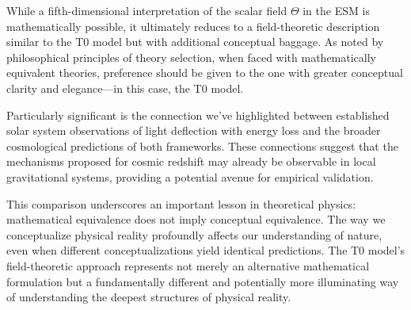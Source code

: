 \documentclass[12pt,a4paper]{article}
\begin{document}
	While a fifth-dimensional interpretation of the scalar field \(\Theta\) in the ESM is mathematically possible, it ultimately reduces to a field-theoretic description similar to the T0 model but with additional conceptual baggage. As noted by philosophical principles of theory selection, when faced with mathematically equivalent theories, preference should be given to the one with greater conceptual clarity and elegance—in this case, the T0 model.
	
	Particularly significant is the connection we've highlighted between established solar system observations of light deflection with energy loss and the broader cosmological predictions of both frameworks. These connections suggest that the mechanisms proposed for cosmic redshift may already be observable in local gravitational systems, providing a potential avenue for empirical validation.
	
	This comparison underscores an important lesson in theoretical physics: mathematical equivalence does not imply conceptual equivalence. The way we conceptualize physical reality profoundly affects our understanding of nature, even when different conceptualizations yield identical predictions. The T0 model's field-theoretic approach represents not merely an alternative mathematical formulation but a fundamentally different and potentially more illuminating way of understanding the deepest structures of physical reality.
	
\end{document}
